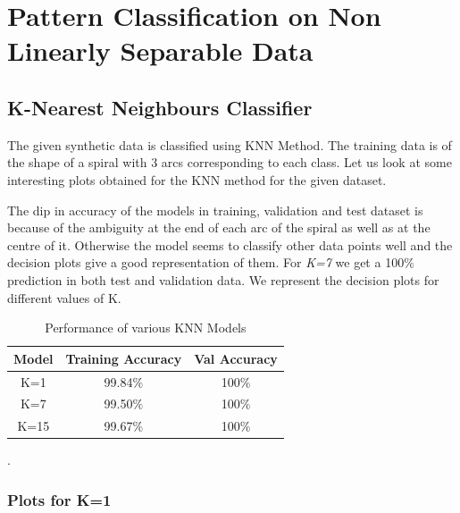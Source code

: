\section{Pattern Classification on Non Linearly Separable Data}

\subsection{K-Nearest Neighbours Classifier}

The given synthetic data is classified using KNN Method. The training data is of the shape of a spiral with 3 arcs corresponding to each class. Let us look at some interesting plots obtained for the KNN method for the given dataset. 

The dip in accuracy of the models in training, validation and test dataset is because of the ambiguity at the end of each arc of the spiral as well as at the centre of it. Otherwise the model seems to classify other data points well and the decision plots give a good representation of them. For \textit{K=7} we get a 100$\%$ prediction in both test and validation data. We represent the decision plots for different values of K.

\hspace{5cm}
{
\begin{table}[!h]
\centering
\begin{tabular}{ |c|c|c|  }
\hline
\rowcolor{lightgray} Model & Training Accuracy & Val Accuracy\\
\hline
K=1 & 99.84$\%$  & 100$\%$  \\   
 \hline
K=7 & 99.50$\%$  & 100$\%$  \\ 
 \hline
K=15 & 99.67$\%$  & 100$\%$ \\ 
\hline
\end{tabular}
\caption{Performance of various KNN Models}.
\label{table:3}
\end{table}
}

\newpage

\subsubsection{Plots for K=1}

